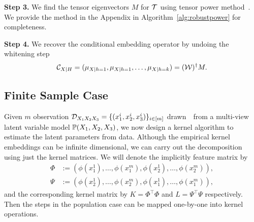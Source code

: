 \documentclass{article}
\begin{document}
{\bf Step 3.} We find the tensor eigenvectors $M$ for ${\mathcal{T}}$ using tensor power method~\cite{AnandkumarEtal:community12}. We provide the method in the Appendix in Algorithm~\ref{alg:robustpower} for completeness.

{\bf Step 4.} We recover the conditional embedding operator by undoing the whitening step
$$
  \mathcal{C}_{X|H} = (\mu_{X|h=1},\mu_{X|h=1},\ldots,\mu_{X|h=k}) = (\mathcal{W})^\dagger M.
$$

\subsection{Finite Sample Case}

Given $m$ observation $\mathcal{D}_{X_1 X_2 X_3}=\{(x_1^i,x_2^i,x_3^i)\}_{i \in [m]}$ drawn~\iid~from a multi-view latent variable model $\mathbb{P}(X_1,X_2,X_3)$, we now design a kernel algorithm to estimate the latent parameters from data. Although the empirical kernel embeddings can be infinite dimensional, we can carry out the decomposition using just the kernel matrices.
We will denote the implicitly feature matrix by
\begin{align*}
  \Phi &:= (\phi(x_1^1), \ldots, \phi(x_1^m), \phi(x_2^1),  \ldots, \phi(x_2^m)),  \\
  \Psi &:= (\phi(x_2^1), \ldots, \phi(x_2^m), \phi(x_1^1),  \ldots, \phi(x_1^m)),
\end{align*}
and the corresponding kernel matrix by $K = \Phi^\top \Phi$ and $L = \Psi^\top \Psi$ respectively.
Then the steps in the population case can be mapped one-by-one into kernel operations.
\end{document}
